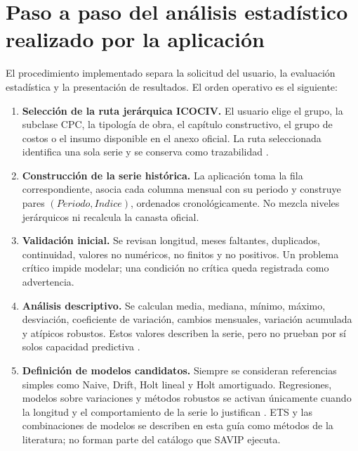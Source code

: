 ﻿\documentclass[12pt,letterpaper]{article}
\begin{document}



\section{Paso a paso del análisis estadístico realizado por la aplicación}
\label{sec:paso_a_paso_app}

El procedimiento implementado separa la solicitud del usuario, la evaluación estadística y la presentación de resultados. El orden operativo es el siguiente:

\begin{enumerate}[leftmargin=*,label=\textbf{Paso \arabic*.}]
    \item \textbf{Selección de la ruta jerárquica ICOCIV.} El usuario elige el grupo, la subclase CPC, la tipología de obra, el capítulo constructivo, el grupo de costos o el insumo disponible en el anexo oficial. La ruta seleccionada identifica una sola serie y se conserva como trazabilidad \citep{dane2021metodologia,dane_ficha_icociv,dane_icociv_web}.

    \item \textbf{Construcción de la serie histórica.} La aplicación toma la fila correspondiente, asocia cada columna mensual con su periodo y construye pares \((Periodo,Indice)\), ordenados cronológicamente. No mezcla niveles jerárquicos ni recalcula la canasta oficial.

    \item \textbf{Validación inicial.} Se revisan longitud, meses faltantes, duplicados, continuidad, valores no numéricos, no finitos y no positivos. Un problema crítico impide modelar; una condición no crítica queda registrada como advertencia.

    \item \textbf{Análisis descriptivo.} Se calculan media, mediana, mínimo, máximo, desviación, coeficiente de variación, cambios mensuales, variación acumulada y atípicos robustos. Estos valores describen la serie, pero no prueban por sí solos capacidad predictiva \citep{nist_eda_summary,nist_outliers}.

    \item \textbf{Definición de modelos candidatos.} Siempre se consideran referencias simples como Naive, Drift, Holt lineal y Holt amortiguado. Regresiones, modelos sobre variaciones y métodos robustos se activan únicamente cuando la longitud y el comportamiento de la serie lo justifican \citep{hyndman2021fpp3,huber1964}. ETS y las combinaciones de modelos se describen en esta guía como métodos de la literatura; no forman parte del catálogo que SAVIP ejecuta.


\end{enumerate}
\end{document}
